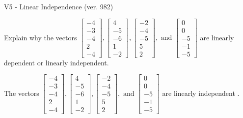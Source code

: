 \begin{exercise}
  \begin{exerciseTitle}V5 - Linear Independence (ver. 982)\end{exerciseTitle}
  \begin{exerciseStatement}
    Explain why the vectors \(\left[\begin{array}{r}
-4 \\
-3 \\
-4 \\
2 \\
-4
\end{array}\right] , \left[\begin{array}{r}
4 \\
-5 \\
-6 \\
1 \\
-2
\end{array}\right] , \left[\begin{array}{r}
-2 \\
-4 \\
-5 \\
5 \\
2
\end{array}\right] , \text{ and } \left[\begin{array}{r}
0 \\
0 \\
-5 \\
-1 \\
-5
\end{array}\right]\) are linearly dependent or linearly independent.	


  \end{exerciseStatement}
  \begin{exerciseAnswer}
   The vectors \(\left[\begin{array}{r}
-4 \\
-3 \\
-4 \\
2 \\
-4
\end{array}\right] , \left[\begin{array}{r}
4 \\
-5 \\
-6 \\
1 \\
-2
\end{array}\right] , \left[\begin{array}{r}
-2 \\
-4 \\
-5 \\
5 \\
2
\end{array}\right] , \text{ and } \left[\begin{array}{r}
0 \\
0 \\
-5 \\
-1 \\
-5
\end{array}\right]\) are 
  	 linearly independent  .
  


  \end{exerciseAnswer}
\end{exercise}